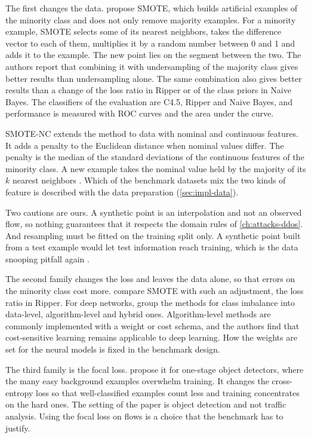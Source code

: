 The first changes the data. \citet{chawla2002smote} propose SMOTE, which
builds artificial examples of the minority class and does not only remove
majority examples. For a minority example, SMOTE selects some of its nearest
neighbors, takes the difference vector to each of them, multiplies it by a
random number between 0 and 1 and adds it to the example. The new point lies
on the segment between the two. The authors report that combining it with
undersampling of the majority class gives better results than undersampling
alone. The same combination also gives better results than a change of the
loss ratio in Ripper or of the class priors in Naive Bayes. The classifiers of
the evaluation are C4.5, Ripper and Naive Bayes, and performance is measured
with ROC curves and the area under the curve.

SMOTE-NC extends the method to data with nominal and continuous features. It
adds a penalty to the Euclidean distance when nominal values differ. The
penalty is the median of the standard deviations of the continuous features
of the minority class. A new example takes the nominal value held by the
majority of its $k$ nearest neighbors \citep{chawla2002smote}. Which of the benchmark datasets
mix the two kinds of feature is described with the data preparation (\cref{sec:impl-data}).

Two cautions are ours. A synthetic point is an interpolation and not an
observed flow, so nothing guarantees that it respects the domain rules of
\cref{ch:attacks-ddos}. And resampling must be fitted on the training split
only. A synthetic point built from a test example would let test information
reach training, which is the data snooping pitfall again
\citep{arp2022dosdonts}.

The second family changes the loss and leaves the data alone, so that errors
on the minority class cost more. \citet{chawla2002smote} compare SMOTE with
such an adjustment, the loss ratio in Ripper. For deep networks,
\citet{johnson2019survey} group the methods for class imbalance into
data-level, algorithm-level and hybrid ones. Algorithm-level methods are
commonly implemented with a weight or cost schema, and the authors find that
cost-sensitive learning remains applicable to deep learning. How the weights
are set for the neural models is fixed in the benchmark design.

The third family is the focal loss. \citet{lin2017focal} propose it for
one-stage object detectors, where the many easy background examples overwhelm
training. It changes the cross-entropy loss so that well-classified examples
count less and training concentrates on the hard ones. The setting of the
paper is object detection and not traffic analysis. Using the focal loss on
flows is a choice that the benchmark has to justify.

